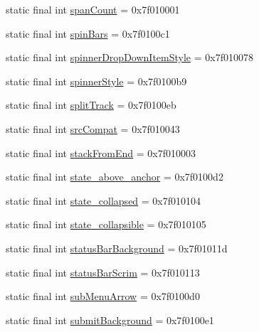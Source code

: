 \begin{CompactItemize}
static final int \hyperlink{classandroid_1_1support_1_1v7_1_1cardview_1_1_r_1_1attr_5fb3939fb90be27c14bdc40a6f78e1dd}{spanCount} = 0x7f010001
\item 
static final int \hyperlink{classandroid_1_1support_1_1v7_1_1cardview_1_1_r_1_1attr_d09b19bafc878f86fc3eb5c0ea22158e}{spinBars} = 0x7f0100c1
\item 
static final int \hyperlink{classandroid_1_1support_1_1v7_1_1cardview_1_1_r_1_1attr_42b9b956b4b9f5cebbb8f625fec43e01}{spinnerDropDownItemStyle} = 0x7f010078
\item 
static final int \hyperlink{classandroid_1_1support_1_1v7_1_1cardview_1_1_r_1_1attr_9d8419ff35575db5c3c24d246fe1c397}{spinnerStyle} = 0x7f0100b9
\item 
static final int \hyperlink{classandroid_1_1support_1_1v7_1_1cardview_1_1_r_1_1attr_8ce90586ae27f4485583fc51cd185879}{splitTrack} = 0x7f0100eb
\item 
static final int \hyperlink{classandroid_1_1support_1_1v7_1_1cardview_1_1_r_1_1attr_90a60940d3b5c748eb70025dac5232f6}{srcCompat} = 0x7f010043
\item 
static final int \hyperlink{classandroid_1_1support_1_1v7_1_1cardview_1_1_r_1_1attr_e777b86b203e1f2925db12419e610209}{stackFromEnd} = 0x7f010003
\item 
static final int \hyperlink{classandroid_1_1support_1_1v7_1_1cardview_1_1_r_1_1attr_02b716646ecebe49b28956550bbf477f}{state\_\-above\_\-anchor} = 0x7f0100d2
\item 
static final int \hyperlink{classandroid_1_1support_1_1v7_1_1cardview_1_1_r_1_1attr_7c4b4862cd93c6568efaceedd20e842a}{state\_\-collapsed} = 0x7f010104
\item 
static final int \hyperlink{classandroid_1_1support_1_1v7_1_1cardview_1_1_r_1_1attr_d8de488fe4ab2e95cc76bf546c4feb35}{state\_\-collapsible} = 0x7f010105
\item 
static final int \hyperlink{classandroid_1_1support_1_1v7_1_1cardview_1_1_r_1_1attr_ed4d045fb2d5038019e9838e878192ed}{statusBarBackground} = 0x7f01011d
\item 
static final int \hyperlink{classandroid_1_1support_1_1v7_1_1cardview_1_1_r_1_1attr_79c489d6be2bac805ec4314b98231d70}{statusBarScrim} = 0x7f010113
\item 
static final int \hyperlink{classandroid_1_1support_1_1v7_1_1cardview_1_1_r_1_1attr_de575d7864d7ce11b203f8622fc9f5ef}{subMenuArrow} = 0x7f0100d0
\item 
static final int \hyperlink{classandroid_1_1support_1_1v7_1_1cardview_1_1_r_1_1attr_53ae5a797eb8b890b1a83ec3a0e3463d}{submitBackground} = 0x7f0100e1

\end{CompactItemize}
